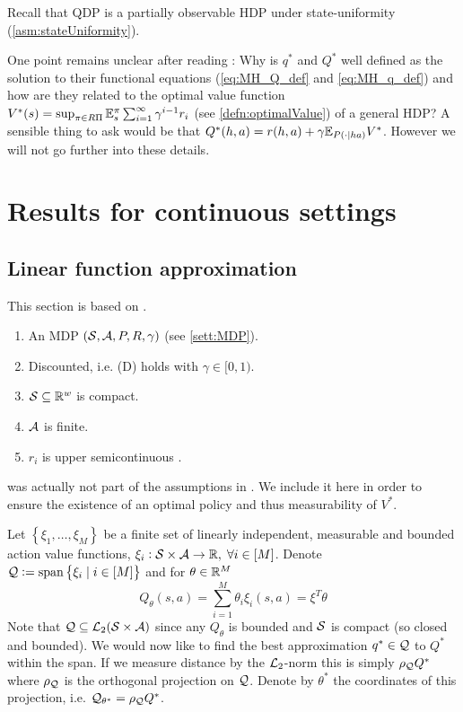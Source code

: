 Recall that QDP is a partially observable HDP under state-uniformity
(\cref{asm:stateUniformity}).

One point remains unclear after reading :
Why is $q^*$ and $Q^*$ well defined as the solution to their
functional equations (\cref{eq:MH_Q_def} and \cref{eq:MH_q_def})
and how are they related to the optimal value function
$V^*(s) = \sup_{\pi \in R\Pi} \mathbb{E}_s^\pi
\sum_{i=1}^\infty \gamma^{i-1} r_i $
(see \cref{defn:optimalValue})
of a general HDP?
A sensible thing to ask would be that
$Q^*(h, a) = r(h, a) + \gamma \mathbb{E}_{P(\cdot \mid h a)} V^*$.
However we will not go further into these details.

\section{Results for continuous settings}

\subsection{Linear function approximation}

This section is based on .

\begin{sett}
  \leavevmode
  \begin{enumerate}
    \item An MDP $(\mathcal{S}, \mathcal{A}, P, R, \gamma)$ (see \cref{sett:MDP}).
    \item Discounted, i.e. (D) holds with $\gamma \in [0,1)$.
    \item $\mathcal{S} \subseteq \mathbb{R}^w$ is compact.
    \item $\mathcal{A}$ is finite.
    \item $r_i$ is upper semicontinuous \label{item:MRlast}.
  \end{enumerate}
  \label{sett:MR}
\end{sett}

\begin{rem}
   was actually not part of the assumptions in
  .
  We include it here in order to ensure the existence of an
  optimal policy and thus measurability of $V^*$.
\end{rem}

Let $\left\{ \xi_1, \dots, \xi_M \right\}$ be a finite set of linearly
independent, measurable and bounded action value functions,
$\xi_i : \mathcal{S} \times \mathcal{A} \to \mathbb{R},\; \forall i \in [M]$.
Denote $\mathcal{Q} \vcentcolon= \mathrm{span}\left\{ \xi_i \mid i \in [M] \right\}$
and for $\theta \in \mathbb{R}^M$
\[ Q_\theta(s, a) = \sum_{i=1}^M \theta_i \xi_i(s, a) = \xi^T \theta \]
Note that $\mathcal{Q} \subseteq \mathcal{L}_2(\mathcal{S}\times\mathcal{A})$ since any
$Q_\theta$ is bounded and $\mathcal{S}$ is compact (so closed and bounded).
We would now like to find the best approximation
$q^* \in \mathcal{Q}$ to $Q^*$ within the span.
If we measure distance by the $\mathcal{L}_2$-norm this is
simply $\rho_\mathcal{Q} Q^*$ where $\rho_\mathcal{Q}$ is the orthogonal projection on
$\mathcal{Q}$. Denote by $\theta^*$ the coordinates of this projection, i.e.
$\mathcal{Q}_{\theta^*} = \rho_\mathcal{Q} Q^*$.

